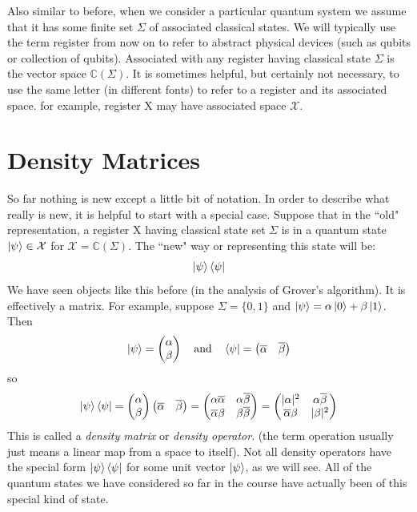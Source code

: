 \documentclass[12pt, oneside]{book}
\theoremstyle{definition}
\theoremstyle{definition}
\theoremstyle{remark}
\begin{document}
Also similar to before, when we consider a particular quantum system we assume that it has some finite set $\Sigma$ of associated classical states. We will typically use the term register from now on to refer to abstract physical devices (such as qubits or collection of qubits). Associated with any register having classical state $\Sigma$ is the vector space $\mathbb{C}(\Sigma)$. It is sometimes helpful, but certainly not necessary, to use the same letter (in different fonts) to refer to a register and its associated space. for example, register X may have associated space $\mathcal{X}$.
\section{Density Matrices}
 So far nothing is new except a little bit of notation. In order to describe what really is new, it is helpful to start with a special case. Suppose that in the ``old" representation, a register X having classical state set $\Sigma$ is in a quantum state $\ket{\psi} \in \mathcal{X}$ for $\mathcal{X} = \mathbb{C}(\Sigma)$. The ``new" way or representing this state will be:
\[
\ket{\psi}\bra{\psi}
\]
We have seen objects like this before (in the analysis of Grover's algorithm). It is effectively a matrix. For example, suppose $\Sigma = \{0,1\}$ and $\ket{\psi}=\alpha\ket{0}+\beta\ket{1}$. Then
\[
\ket{\psi}=\begin{pmatrix} \alpha \\ \beta \end{pmatrix} \quad \text{and} \quad \bra{\psi} = \begin{pmatrix} \overline{\alpha} & \overline{\beta} \end{pmatrix}
\]
so
\[
\ket{\psi}\bra{\psi} =\begin{pmatrix} \alpha \\ \beta \end{pmatrix} \begin{pmatrix} \overline{\alpha} & \overline{\beta} \end{pmatrix} = \begin{pmatrix} \alpha\overline{\alpha}  & \alpha\overline{\beta} \\ \overline{\alpha} \beta & \beta\overline{\beta} \end{pmatrix} = \begin{pmatrix} |\alpha|^2 & \alpha \overline{\beta} \\ \overline{\alpha}\beta & |\beta|^2 \end{pmatrix}
\]
This is called a \textit{density matrix} or \textit{density operator}. (the term operation usually just means a linear map from a space to itself). Not all density operators have the special form $\ket{\psi}\bra{\psi}$ for some unit vector $\ket{\psi}$, as we will see. All of the quantum states we have considered so far in the course have actually been of this special kind of state.
\end{document}

